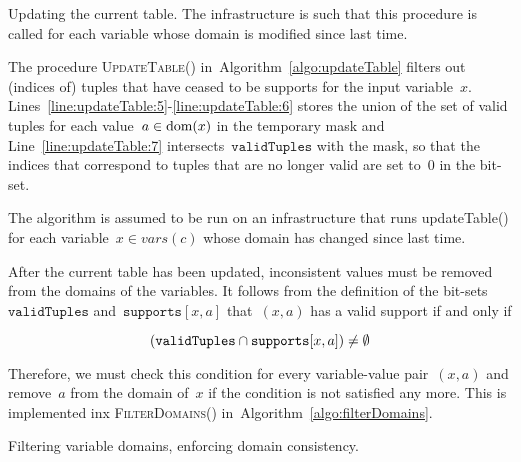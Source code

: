 \documentclass[a4paper,11pt]{article}
\newcommand{\Algoref}[1]{Algorithm~\ref{#1}}
\newcommand{\Lineref}[1]{Line~\ref{#1}}
\newcommand{\Linesref}[2]{Lines~\ref{#1}-\ref{#2}}
\newcommand{\CurrTable}{\texttt{validTuples}}
\newcommand{\Supports}{\texttt{supports}}
\def\UpdateTable{\textsc{UpdateTable}}
\def\FilterDomains{\textsc{FilterDomains}}
\numberwithin{equation}{section}
\begin{document}
  \begin{algorithm}[H]
  \begin{algorithmic}[1]  %
    
  \end{algorithmic}
  \caption{Updating the current table. The infrastructure
  is such that this procedure is called for each variable whose domain is
  modified since last time.}
  \label{algo:updateTable}
\end{algorithm}

  The procedure \UpdateTable() in~\Algoref{algo:updateTable}
  filters out (indices of)
  tuples that have ceased to be supports for the input variable~$x$.
  \Linesref{line:updateTable:5}{line:updateTable:6} stores the union of the
  set of valid tuples for each value~$a \in \text{dom}(x)$ in the temporary mask
  and \Lineref{line:updateTable:7} intersects~$\CurrTable$ with the mask,
  so that the indices that correspond to tuples that are no longer valid
  are set to~$0$ in the bit-set.

  The algorithm is assumed to be run on an infrastructure that runs updateTable()
  for each variable~$x \in vars(c)$ whose domain has changed since last time.
  
  After the current table has been updated, inconsistent values must be removed
  from the domains of the variables.   
  It follows from the definition of the bit-sets~$\CurrTable$ and~$\Supports[x,a]$
  that~$(x,a)$ has a valid support if and only if 

  \begin{equation}
    \label{eq:validcond}
    (\CurrTable \Inter \Supports[x,a]) \neq \emptyset
  \end{equation}

  Therefore, we must check this condition for every variable-value pair~$(x,a)$ and
  remove~$a$ from the domain of~$x$ if the condition is not satisfied any more.
  This is implemented inx \FilterDomains()
  in~\Algoref{algo:filterDomains}.%

  \begin{algorithm}[H]
    \begin{algorithmic}[1]  %
      
    \end{algorithmic}
    \caption{Filtering variable domains, enforcing domain consistency.}
        \label{algo:filterDomains}
  \end{algorithm}
\end{document}
